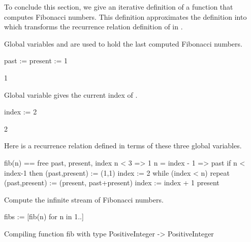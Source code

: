 To conclude this section, we give an iterative definition of
a function that computes Fibonacci numbers.
This definition approximates the definition into which \Language{}
transforms the recurrence relation definition of  in
.

\begin{xtc}
\begin{xtccomment}
Global variables
 and  are used
to hold the last computed Fibonacci numbers.
\end{xtccomment}
\begin{spadsrc}
past := present := 1
\end{spadsrc}
\begin{TeXOutput}
\begin{fricasmath}{21}
1%
\end{fricasmath}
\end{TeXOutput}
\end{xtc}
\begin{xtc}
\begin{xtccomment}
Global variable  gives the
current index of .
\end{xtccomment}
\begin{spadsrc}
index := 2
\end{spadsrc}
\begin{TeXOutput}
\begin{fricasmath}{22}
2%
\end{fricasmath}
\end{TeXOutput}
\end{xtc}
\begin{xtc}
\begin{xtccomment}
Here is a recurrence relation defined in terms
of these three global variables.
\end{xtccomment}
\begin{spadsrc}
fib(n) ==
  free past, present, index
  n < 3 => 1
  n = index - 1 => past
  if n < index-1 then
    (past,present) := (1,1)
    index := 2
  while (index < n) repeat
    (past,present) := (present, past+present)
    index := index + 1
  present
\end{spadsrc}
\end{xtc}
\begin{xtc}
\begin{xtccomment}
Compute the infinite stream of Fibonacci numbers.
\end{xtccomment}
\begin{spadsrc}
fibs := [fib(n) for n in 1..] 
\end{spadsrc}
\begin{MessageOutput}
   Compiling function fib with type PositiveInteger -> PositiveInteger 
\end{MessageOutput}
\begin{TeXOutput}
\begin{fricasmath}{24}
%
\end{fricasmath}
\end{TeXOutput}
\end{xtc}
